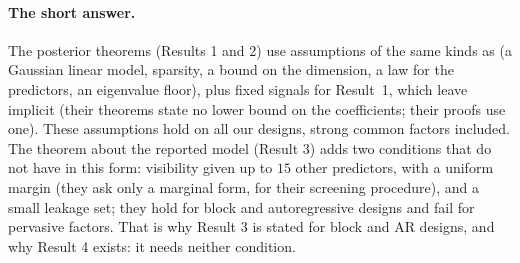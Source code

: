 \paragraph{The short answer.} The posterior theorems (Results 1 and 2) use assumptions of the same kinds as \SL{}
(a Gaussian linear model, sparsity, a bound on the dimension, a law for the predictors, an eigenvalue floor), plus fixed
signals for Result~1, which \SL{} leave implicit (their theorems state no lower bound on the coefficients; their proofs
use one). These assumptions hold on all our designs, strong common factors included. The theorem about the reported model (Result 3) adds two
conditions that \SL{} do not have in this form: visibility given up to $15$ other predictors, with a uniform margin
(they ask only a marginal form, for their screening procedure), and a small leakage set; they hold for block and autoregressive designs and
fail for pervasive factors. That is why Result 3 is stated for block and AR designs, and why Result 4 exists: it needs
neither condition.

